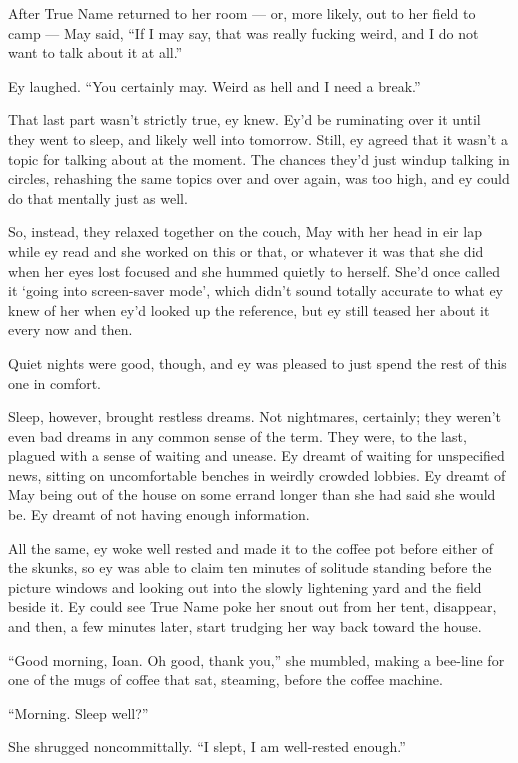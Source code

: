 After True Name returned to her room — or, more likely, out to her field to camp — May said, ``If I may say, that was really fucking weird, and I do not want to talk about it at all.''

Ey laughed. ``You certainly may. Weird as hell and I need a break.''

That last part wasn't strictly true, ey knew. Ey'd be ruminating over it until they went to sleep, and likely well into tomorrow. Still, ey agreed that it wasn't a topic for talking about at the moment. The chances they'd just windup talking in circles, rehashing the same topics over and over again, was too high, and ey could do that mentally just as well.

So, instead, they relaxed together on the couch, May with her head in eir lap while ey read and she worked on this or that, or whatever it was that she did when her eyes lost focused and she hummed quietly to herself. She'd once called it `going into screen-saver mode', which didn't sound totally accurate to what ey knew of her when ey'd looked up the reference, but ey still teased her about it every now and then.

Quiet nights were good, though, and ey was pleased to just spend the rest of this one in comfort.

Sleep, however, brought restless dreams. Not nightmares, certainly; they weren't even bad dreams in any common sense of the term. They were, to the last, plagued with a sense of waiting and unease. Ey dreamt of waiting for unspecified news, sitting on uncomfortable benches in weirdly crowded lobbies. Ey dreamt of May being out of the house on some errand longer than she had said she would be. Ey dreamt of not having enough information.

All the same, ey woke well rested and made it to the coffee pot before either of the skunks, so ey was able to claim ten minutes of solitude standing before the picture windows and looking out into the slowly lightening yard and the field beside it. Ey could see True Name poke her snout out from her tent, disappear, and then, a few minutes later, start trudging her way back toward the house.

``Good morning, Ioan. Oh good, thank you,'' she mumbled, making a bee-line for one of the mugs of coffee that sat, steaming, before the coffee machine.

``Morning. Sleep well?''

She shrugged noncommittally. ``I slept, I am well-rested enough.''

